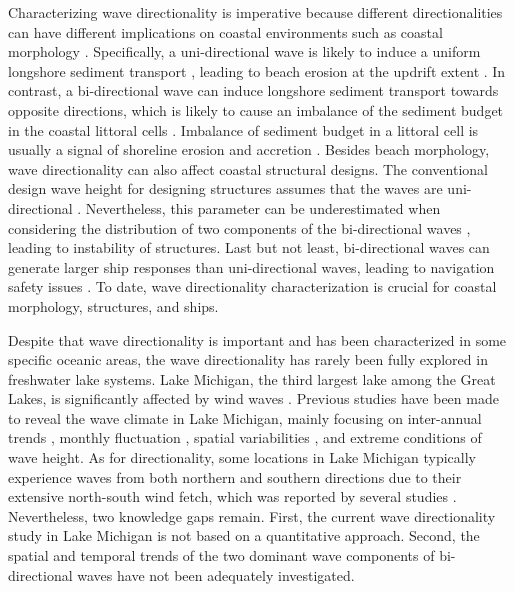 Characterizing wave directionality is imperative because different
directionalities can have different implications on coastal environments such as
coastal morphology \citep{ranasinghe_southern_2004}. Specifically, a
uni-directional wave is likely to induce a uniform longshore sediment transport
\citep{scott_role_2021}, leading to beach erosion at the updrift extent
\citep{klein_short-term_2002}. In contrast, a bi-directional wave can induce
longshore sediment transport towards opposite directions, which is likely to
cause an imbalance of the sediment budget in the coastal littoral cells
\citep{usace_cem_2002}. Imbalance of sediment budget in a littoral cell is
usually a signal of shoreline erosion and accretion
\citep{hapke_review_2010,lopez-olmedilla_effect_2022}. Besides beach morphology,
wave directionality can also affect coastal structural designs. The conventional
design wave height for designing structures assumes that the waves are
uni-directional \citep{sanil_kumar_design_2004}. Nevertheless, this parameter
can be underestimated when considering the distribution of two components of the
bi-directional waves \citep{sanil_kumar_design_2004}, leading to instability of
structures. Last but not least, bi-directional waves can generate larger ship
responses than uni-directional waves, leading to navigation safety issues
\citep{huang_cfd_2021}. To date, wave directionality characterization is crucial
for coastal morphology, structures, and ships.

Despite that wave directionality is important and has been characterized in some
specific oceanic areas, the wave directionality has rarely been fully explored
in freshwater lake systems. Lake Michigan, the third largest lake among the
Great Lakes, is significantly affected by wind waves
\citep{huang_impacts_2021,huang_wave_2021}. Previous studies have been made to
reveal the wave climate in Lake Michigan, mainly focusing on inter-annual trends
\citep{olsen_long_2019,jabbari_increases_2021}, monthly fluctuation
\citep{meadows_relationship_1997,huang_wave_2021}, spatial variabilities
\citep{huang_wave_2021}, and extreme conditions
\citep{sogut_characterizing_2018} of wave height. As for directionality, some
locations in Lake Michigan typically experience waves from both northern and
southern directions due to their extensive north-south wind fetch, which was
reported by several studies
\citep{davidson-arnott_wave_1980,booth_wave_1994,olsen_long_2019,abdelhady_shoreline_2025}.
Nevertheless, two knowledge gaps remain. First, the current wave directionality
study in Lake Michigan is not based on a quantitative approach. Second, the
spatial and temporal trends of the two dominant wave components of
bi-directional waves have not been adequately investigated.

